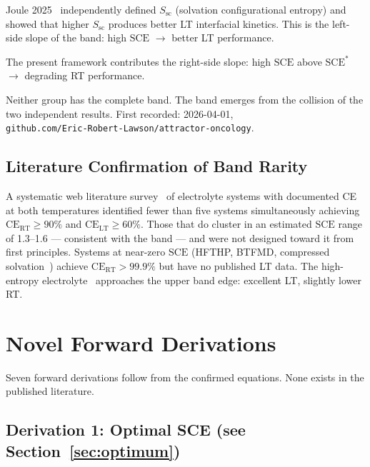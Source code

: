\documentclass[12pt,letterpaper]{article}
\newcommand{\mSCE}{\mathrm{SCE}}
\newcommand{\mSCEstar}{\mathrm{SCE}^{*}}
\begin{document}
Joule 2025~\cite{joule2025hunan} independently defined
$S_{\mathrm{sc}}$ (solvation configurational entropy)
and showed that higher $S_{\mathrm{sc}}$ produces better
LT interfacial kinetics.
This is the left-side slope of the band:
high $\mSCE$ $\rightarrow$ better LT performance.

The present framework contributes the right-side slope:
high $\mSCE$ above $\mSCEstar$ $\rightarrow$ degrading
RT performance.

Neither group has the complete band.
The band emerges from the collision of the two independent
results.
First recorded: 2026-04-01,\\
\texttt{github.com/Eric-Robert-Lawson/attractor-oncology}.

\subsection{Literature Confirmation of Band Rarity}
\label{sec:rarity}

A systematic web literature survey~\cite{mu2026query9}
of electrolyte systems with documented CE at both
temperatures identified fewer than five systems
simultaneously achieving
$\mathrm{CE}_{\mathrm{RT}} \geq 90\%$ and
$\mathrm{CE}_{\mathrm{LT}} \geq 60\%$.
Those that do cluster in an estimated $\mSCE$ range of
1.3--1.6 --- consistent with the band --- and were not
designed toward it from first principles.
Systems at near-zero $\mSCE$ (HFTHP, BTFMD, compressed
solvation~\cite{natcomm2025compressed}) achieve
$\mathrm{CE}_{\mathrm{RT}} > 99.9\%$ but have no
published LT data.
The high-entropy electrolyte~\cite{natenergy2023hee}
approaches the upper band edge: excellent LT,
slightly lower RT.

\section{Novel Forward Derivations}
\label{sec:derivations}

Seven forward derivations follow from the confirmed
equations.
None exists in the published literature.

\subsection{Derivation 1: Optimal SCE
(see Section~\ref{sec:optimum})}
\end{document}
